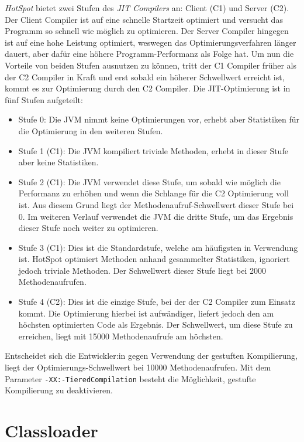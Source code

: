 \textit{HotSpot} bietet zwei Stufen des \textit{JIT Compilers} an: Client (C1) und Server (C2). Der Client Compiler ist auf eine schnelle Startzeit optimiert und versucht das Programm so schnell wie möglich zu optimieren. Der Server Compiler hingegen ist auf eine hohe Leistung optimiert, weswegen das Optimierungsverfahren länger dauert, aber dafür eine höhere Programm-Performanz als Folge hat. Um nun die Vorteile von beiden Stufen ausnutzen zu können, tritt der C1 Compiler früher als der C2 Compiler in Kraft und erst sobald ein höherer Schwellwert erreicht ist, kommt es zur Optimierung durch den C2 Compiler. Die JIT-Optimierung ist in fünf Stufen aufgeteilt:
\begin{itemize}
    \item Stufe 0: Die JVM nimmt keine Optimierungen vor, erhebt aber Statistiken für die Optimierung in den weiteren Stufen.
    \item Stufe 1 (C1): Die JVM kompiliert triviale Methoden, erhebt in dieser Stufe aber keine Statistiken.
    \item Stufe 2 (C1): Die JVM verwendet diese Stufe, um sobald wie möglich die Performanz zu erhöhen und wenn die Schlange für die C2 Optimierung voll ist. Aus diesem Grund liegt der Methodenaufruf-Schwellwert dieser Stufe bei 0. Im weiteren Verlauf verwendet die JVM die dritte Stufe, um das Ergebnis dieser Stufe noch weiter zu optimieren.
    \item Stufe 3 (C1): Dies ist die Standardstufe, welche am häufigsten in Verwendung ist. HotSpot optimiert Methoden anhand gesammelter Statistiken, ignoriert jedoch triviale Methoden. Der Schwellwert dieser Stufe liegt bei 2000 Methodenaufrufen.
    \item Stufe 4 (C2): Dies ist die einzige Stufe, bei der der C2 Compiler zum Einsatz kommt. Die Optimierung hierbei ist aufwändiger, liefert jedoch den am höchsten optimierten Code als Ergebnis. Der Schwellwert, um diese Stufe zu erreichen, liegt mit 15000 Methodenaufrufe am höchsten.
\end{itemize}

Entscheidet sich die Entwickler:in gegen Verwendung der gestuften Kompilierung, liegt der Optimierungs-Schwellwert bei 10000 Methodenaufrufen. Mit dem Parameter \texttt{-XX:-TieredCompilation} besteht die Möglichkeit, gestufte Kompilierung zu deaktivieren.

\section{Classloader}


